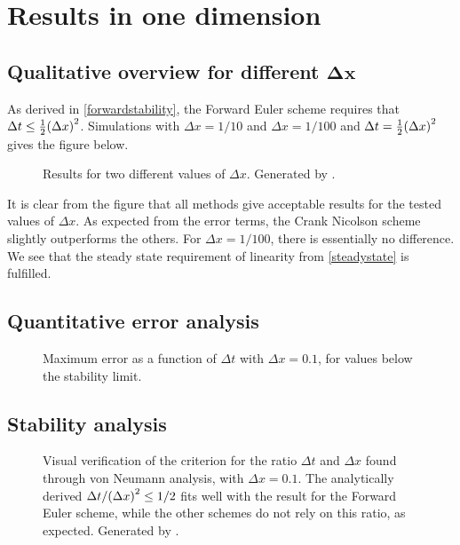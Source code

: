%
\section{Results in one dimension}
\subsection{Qualitative overview for different \(\boldsymbol{\Delta x}\)}
As derived in \ref{forwardstability}, the Forward Euler scheme requires that \(\Delta t \leq \tfrac{1}{2}\qty(\Delta x)^2\). Simulations with \(\Delta x = 1/10\) and \(\Delta x = 1/100\) and \(\Delta t = \tfrac{1}{2}\qty(\Delta x)^2\) gives the figure below.
\begin{figure}[H]
\centering

\caption{Results for two different values of \(\Delta x\). Generated by .}
\end{figure}
It is clear from the figure that all methods give acceptable results for the tested values of \(\Delta x\). As expected from the error terms, the Crank Nicolson scheme slightly outperforms the others. For \(\Delta x=1/100\), there is essentially no difference. We see that the steady state requirement of linearity from \ref{steadystate} is fulfilled.

\subsection{Quantitative error analysis}
\begin{figure}[H]

\caption{Maximum error as a function of \(\Delta t\) with \(\Delta x=\num{0.1}\), for values below the stability limit.}
\end{figure}


\subsection{Stability analysis}
\begin{figure}[H]
\centering

\caption{Visual verification of the criterion for the ratio \(\Delta t\) and \(\Delta x\) found through von Neumann analysis, with \(\Delta x = \num{0.1}\). The analytically derived \(\Delta t/\qty(\Delta x)^2\leq1/2\) fits well with the result for the Forward Euler scheme, while the other schemes do not rely on this ratio, as expected. Generated by .}
\end{figure}
